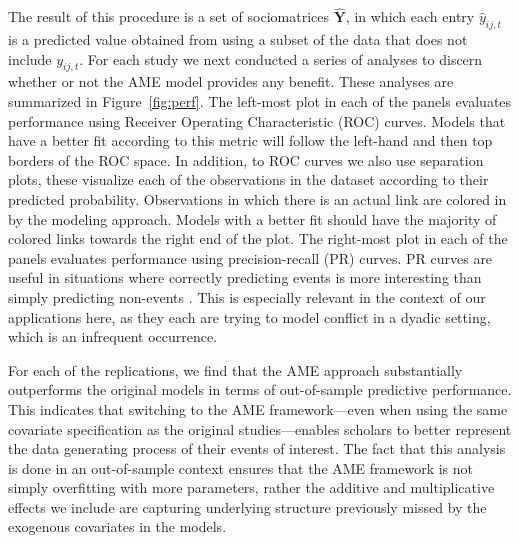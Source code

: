 The result of this procedure is a set of sociomatrices $\bm \hat Y$, in which each entry $\hat y_{ij,t}$ is a predicted value obtained from using a subset of the data that does not include $y_{ij,t}$. For each study we next conducted a series of analyses to discern whether or not the AME model provides any benefit. These analyses are summarized in Figure~\ref{fig:perf}. The left-most plot in each of the panels evaluates performance using Receiver Operating Characteristic (ROC) curves. Models that have a better fit according to this metric will follow the left-hand and then top borders of the ROC space. In addition, to ROC curves we also use separation plots, these visualize each of the observations in the dataset according to their predicted probability. Observations in which there is an actual link are colored in by the modeling approach. Models with a better fit should have the majority of colored links towards the right end of the plot. The right-most plot in each of the panels evaluates performance using precision-recall (PR) curves. PR curves are useful in situations where correctly predicting events is more interesting than simply predicting non-events \citep{davis:goadrich:2006}. This is especially relevant in the context of our applications here, as they each are trying to model conflict in a dyadic setting, which is an infrequent occurrence. 

For each of the replications, we find that the AME approach substantially outperforms the original models in terms of out-of-sample predictive performance. This indicates that switching to the AME framework---even when using the same covariate specification as the original studies---enables scholars to better represent the data generating process of their events of interest. The fact that this analysis is done in an out-of-sample context ensures that the AME framework is not simply overfitting with more parameters, rather the additive and multiplicative effects we include are capturing underlying structure previously missed by the exogenous covariates in the models.


